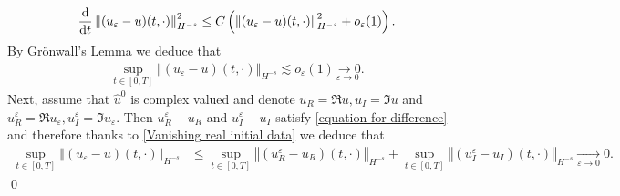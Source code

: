\documentclass[11pt,reqno]{amsart}
\numberwithin{equation}{section}
\def\dd{{\rm d}}
\begin{document}
\begin{align*}
\frac{\dd}{\dd t}\left\Vert (u_{\varepsilon}-u)(t,\cdot)\right\Vert_{H^{-s}}^{2}\leq C\left(\left\Vert (u_{\varepsilon}-u)(t,\cdot)\right\Vert_{H^{-s}}^{2}+o_{\varepsilon}(1) \right).     
\end{align*}
By Gr\"onwall's Lemma we deduce that 
\begin{align}
\underset{t\in [0,T]}{\sup}\left\Vert (u_{\varepsilon}-u)(t,\cdot)\right\Vert_{H^{-s}}\lesssim o_{\varepsilon}(1)\underset{\varepsilon \rightarrow 0}{\rightarrow 0}. \label{Vanishing real initial data} \end{align}
Next, assume that 
$\widehat{u}^{0}$ is complex valued and denote $u_{R}=\Re u, u_{I}=\Im u$ and $u_{R}^{\varepsilon}=\Re u_{\varepsilon},u_{I}^{\varepsilon}=\Im u_{\varepsilon}$. Then $u_{R}^{\varepsilon}-u_{R}$ and $u_{I}^{\varepsilon}-u_{I}$ satisfy \eqref{equation for difference} and therefore thanks to \eqref{Vanishing real initial data} we deduce that  
\begin{align*}
\underset{t\in [0,T]}{\sup}\left\Vert (u_{\varepsilon}-u)(t,\cdot)\right\Vert_{H^{-s}}&\leq \underset{t\in [0,T]}{\sup}\left\Vert (u_{R}^{\varepsilon}-u_{R})(t,\cdot)\right\Vert_{H^{-s}}+\underset{t\in [0,T]}{\sup}\left\Vert (u_{I}^{\varepsilon}-u_{I})(t,\cdot)\right\Vert_{H^{-s}}\underset{\varepsilon \rightarrow 0}{\rightarrow} 0.  \end{align*}
\qed
\end{document}
